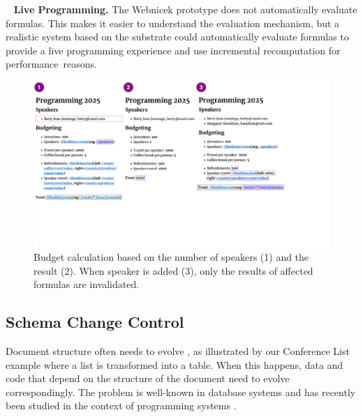\documentclass[sigconf,anonymous,screen]{acmart}
\DeclareRobustCommand{\keyideabox}[3]{\begin{tcolorbox}[breakable,
  boxsep=5pt,left=0pt,right=0pt,top=0pt,bottom=0pt,width=\dimexpr\columnwidth\relax,
  colback=gray!20,colframe=gray!20,
  enlarge bottom by=0pt,enlarge top by=0pt,
  arc=0pt,outer arc=0pt]
\lettrine[lraise=0.3]{\LARGE #1}{~}
\small \textbf{#2.} #3
\end{tcolorbox}
}
\begin{document}
\keyideabox{\faRefresh}{Live Programming}{The Webnicek prototype does not automatically
evaluate formulas. This makes it easier to understand the evaluation
mechanism, but a realistic system based on the substrate could automatically evaluate
formulas to provide a live programming experience \cite{petricek-2020-foundations,rein-2019-live}
and use incremental recomputation for performance~reasons.}


\begin{figure}[t]
  \includegraphics[width=1\columnwidth,clip,trim=0.1cm 5cm 5.1cm 0cm]{fig/incremental.pdf}
  \vspace{-1em}
  \caption{Budget calculation based on the number of speakers (1) and the result (2). When speaker
  is added (3), only the results of affected formulas are invalidated.}
  \label{fig:incremental}
  \vspace{-1em}
\end{figure}


\subsection{Schema Change Control}
\label{sec:impl-schema}

Document structure often needs to evolve \cite{burnett-2014-silos}, as illustrated by our
Conference List example where a list is transformed into a table. When this happens,
data and code that depend on the structure of the document need to evolve correspondingly.
The problem is well-known in database systems \cite{rahm-2006-schema} and has recently been
studied in the context of programming systems \cite{edwards-2025-schema}.
\end{document}
